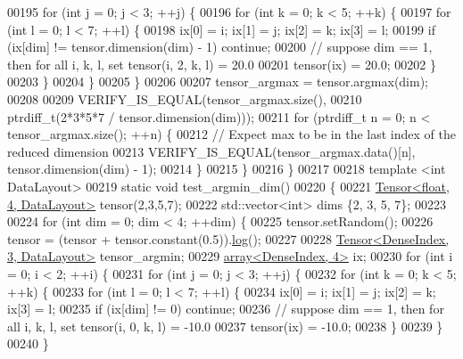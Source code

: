 \begin{DoxyCode}
00195       \textcolor{keywordflow}{for} (\textcolor{keywordtype}{int} j = 0; j < 3; ++j) \{
00196         \textcolor{keywordflow}{for} (\textcolor{keywordtype}{int} k = 0; k < 5; ++k) \{
00197           \textcolor{keywordflow}{for} (\textcolor{keywordtype}{int} l = 0; l < 7; ++l) \{
00198             ix[0] = i; ix[1] = j; ix[2] = k; ix[3] = l;
00199             \textcolor{keywordflow}{if} (ix[dim] != tensor.dimension(dim) - 1) \textcolor{keywordflow}{continue};
00200             \textcolor{comment}{// suppose dim == 1, then for all i, k, l, set tensor(i, 2, k, l) = 20.0}
00201             tensor(ix) = 20.0;
00202           \}
00203         \}
00204       \}
00205     \}
00206 
00207     tensor\_argmax = tensor.argmax(dim);
00208 
00209     VERIFY\_IS\_EQUAL(tensor\_argmax.size(),
00210                     ptrdiff\_t(2*3*5*7 / tensor.dimension(dim)));
00211     \textcolor{keywordflow}{for} (ptrdiff\_t n = 0; n < tensor\_argmax.size(); ++n) \{
00212       \textcolor{comment}{// Expect max to be in the last index of the reduced dimension}
00213       VERIFY\_IS\_EQUAL(tensor\_argmax.data()[n], tensor.dimension(dim) - 1);
00214     \}
00215   \}
00216 \}
00217 
00218 \textcolor{keyword}{template} <\textcolor{keywordtype}{int} DataLayout>
00219 \textcolor{keyword}{static} \textcolor{keywordtype}{void} test\_argmin\_dim()
00220 \{
00221   \hyperlink{class_eigen_1_1_tensor}{Tensor<float, 4, DataLayout>} tensor(2,3,5,7);
00222   std::vector<int> dims \{2, 3, 5, 7\};
00223 
00224   \textcolor{keywordflow}{for} (\textcolor{keywordtype}{int} dim = 0; dim < 4; ++dim) \{
00225     tensor.setRandom();
00226     tensor = (tensor + tensor.constant(0.5)).\hyperlink{structlog}{log}();
00227 
00228     \hyperlink{class_eigen_1_1_tensor}{Tensor<DenseIndex, 3, DataLayout>} tensor\_argmin;
00229     \hyperlink{class_eigen_1_1array}{array<DenseIndex, 4>} ix;
00230     \textcolor{keywordflow}{for} (\textcolor{keywordtype}{int} i = 0; i < 2; ++i) \{
00231       \textcolor{keywordflow}{for} (\textcolor{keywordtype}{int} j = 0; j < 3; ++j) \{
00232         \textcolor{keywordflow}{for} (\textcolor{keywordtype}{int} k = 0; k < 5; ++k) \{
00233           \textcolor{keywordflow}{for} (\textcolor{keywordtype}{int} l = 0; l < 7; ++l) \{
00234             ix[0] = i; ix[1] = j; ix[2] = k; ix[3] = l;
00235             \textcolor{keywordflow}{if} (ix[dim] != 0) \textcolor{keywordflow}{continue};
00236             \textcolor{comment}{// suppose dim == 1, then for all i, k, l, set tensor(i, 0, k, l) = -10.0}
00237             tensor(ix) = -10.0;
00238           \}
00239         \}
00240       \}

\end{DoxyCode}
